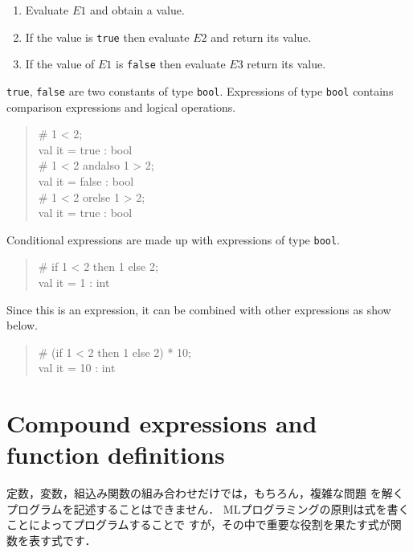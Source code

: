 \documentclass{jbook}
\newcommand{\txt}[2]{#2}
\newenvironment{program}{\begin{quote}\begin{tt}}%
                        {\end{tt}\end{quote}}
\begin{document}
\begin{enumerate}
\item Evaluate $E1$ and obtain a value.
\item If the value is {\tt true} then evaluate $E2$ and return its value.
\item If the value of $E1$ is {\tt false} then evaluate $E3$ return its value.
\end{enumerate}
	{\tt true}, {\tt false} are two constants of type {\tt bool}.
	Expressions of type {\tt bool} contains comparison expressions
and logical operations.
\begin{program}
\# 1 < 2;\\
val it = true : bool\\
\# 1 < 2 andalso 1 > 2;\\
val it = false : bool\\
\# 1 < 2 orelse 1 > 2;\\
val it = true : bool
\end{program}
	Conditional expressions are made up with expressions of type
{\tt bool}.
\begin{program}
\# if 1 < 2 then 1 else 2;\\
val it = 1 : int
\end{program}
	Since this is an expression, it can be combined with other
expressions as show below.
\begin{program}
\# (if 1 < 2 then 1 else 2) * 10;\\
val it = 10 : int
\end{program}
\fi%


\section{
\txt{複雑な式と関数}
{Compound expressions and function definitions}
}
\label{sec:tutorialFunction}

\ifjp%
	定数，変数，組込み関数の組み合わせだけでは，もちろん，複雑な問題
を解くプログラムを記述することはできません． 
	MLプログラミングの原則は式を書くことによってプログラムすることで
すが，その中で重要な役割を果たす式が関数を表す式です．
\end{document}
